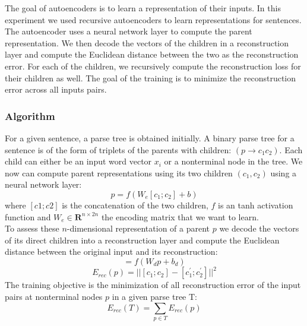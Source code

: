 \documentclass[conference]{IEEEtran}
\begin{document}
The goal of autoencoders is to learn a representation of their inputs. In this experiment we used recursive autoencoders to learn representations for sentences. The autoencoder uses a neural network layer to compute the parent representation. We then decode the vectors of the children in a reconstruction layer and compute the Euclidean distance between the two as the reconstruction error. For each of the children, we recursively compute the reconstruction loss for their children as well. The goal of the training is to minimize the reconstruction error across all inputs pairs. 
\subsubsection{Algorithm}
For a given sentence, a parse tree is obtained initially. A binary parse tree for a sentence is of the form of triplets of the parents with children: $(p \rightarrow c_1c_2)$. Each child can either be an input word vector $x_i$ or a nonterminal node in the tree. We now can compute parent representations using its two children $(c_1, c_2)$ using a neural network layer:\\

\begin{equation}
p = f(W_e[c_1;c_2] + b)
\end{equation}
where $[c1;c2]$ is the concatenation of the two children, $f$ is an tanh activation function and $W_e \in \mathbf{R}^{n \times 2n}$ the encoding matrix that we want to learn.\\

To assess these $n$-dimensional representation of a parent $p$ we decode the vectors of its direct children into a reconstruction layer and compute the Euclidean distance between the original input and its reconstruction:\\

\begin{equation}
[c^\prime_1;c^\prime_2] = f(W_dp + b_d)
\end{equation}
\begin{equation}
E_{rec}(p) = ||[c_1;c_2] - [c^\prime_1;c^\prime_2]||^2
\end{equation}
The training objective is the minimization of all reconstruction error of the input pairs at nonterminal nodes $p$ in a given parse tree T:\\
\begin{equation}
E_{rec}(T) = \sum_{p \in T} E_{rec}(p)
\end{equation}\\
\end{document}
